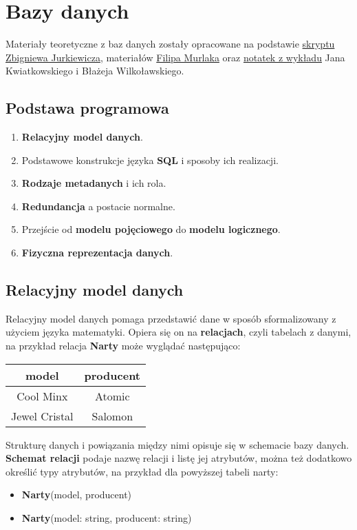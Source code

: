 \chapter{Bazy danych}

Materiały teoretyczne z baz danych zostały opracowane na podstawie \href{https://mst.mimuw.edu.pl/wyklady/bad/wyklad.pdf}{skryptu Zbigniewa Jurkiewicza}, materiałów \href{https://www.mimuw.edu.pl/~fmurlak/}{Filipa Murlaka} oraz \href{https://www.overleaf.com/read/gwpgjmvkvrjz}{notatek z wykładu} Jana Kwiatkowskiego i Błażeja Wilkoławskiego.

\section*{Podstawa programowa}
\begin{enumerate}
    \item \textbf{Relacyjny model danych}.
    \item Podstawowe konstrukcje języka \textbf{SQL} i sposoby ich realizacji.
    \item \textbf{Rodzaje metadanych} i ich rola.
    \item \textbf{Redundancja} a postacie normalne.
    \item Przejście od \textbf{modelu pojęciowego} do \textbf{modelu logicznego}.
    \item \textbf{Fizyczna reprezentacja danych}.
\end{enumerate}

\section{Relacyjny model danych}

Relacyjny model danych pomaga przedstawić dane w sposób sformalizowany z użyciem języka matematyki. Opiera się on na \textbf{relacjach}, czyli tabelach z danymi, na przykład relacja \textbf{Narty} może wyglądać następująco:
    \begin{center}
    \begin{tabular}{c|c}
    model & producent \\ \hline
    Cool Minx & Atomic \\
    Jewel Cristal & Salomon              
    \end{tabular}
    \end{center}

Strukturę danych i powiązania między nimi opisuje się w schemacie bazy danych. \textbf{Schemat relacji} podaje nazwę relacji i listę jej atrybutów, można też dodatkowo określić typy atrybutów, na przykład dla powyższej tabeli narty:
\begin{itemize}
    \item \textbf{Narty}(model, producent)
    \item \textbf{Narty}(model: string, producent: string)
\end{itemize}

